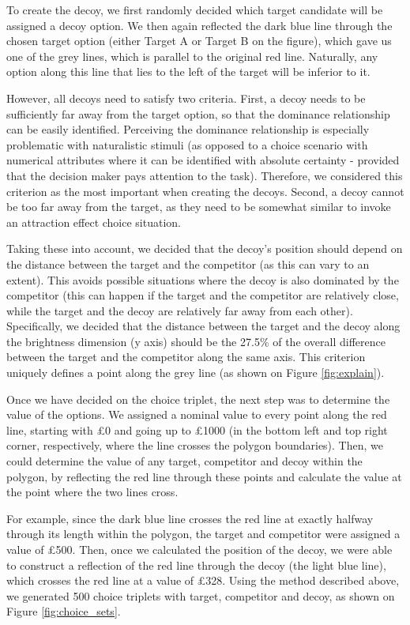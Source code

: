 \documentclass[11pt,a4paper]{article}
\begin{document}
To create the decoy, we first randomly decided which target candidate will be assigned a decoy option. We then again reflected the dark blue line through the chosen target option (either Target A or Target B on the figure), which gave us one of the grey lines, which is parallel to the original red line. Naturally, any option along this line that lies to the left of the target will be inferior to it. 

However, all decoys need to satisfy two criteria. First, a decoy needs to be sufficiently far away from the target option, so that the dominance relationship can be easily identified. Perceiving the dominance relationship is especially problematic with naturalistic stimuli (as opposed to a choice scenario with numerical attributes where it can be identified with absolute certainty - provided that the decision maker pays attention to the task). Therefore, we considered this criterion as the most important when creating the decoys. Second, a decoy cannot be too far away from the target, as they need to be somewhat similar to invoke an attraction effect choice situation.

Taking these into account, we decided that the decoy's position should depend on the distance between the target and the competitor (as this can vary to an extent). This avoids possible situations where the decoy is also dominated by the competitor (this can happen if the target and the competitor are relatively close, while the target and the decoy are relatively far away from each other). Specifically, we decided that the distance between the target and the decoy along the brightness dimension (y axis) should be the 27.5\% of the overall difference between the target and the competitor along the same axis. This criterion uniquely defines a point along the grey line (as shown on Figure \ref{fig:explain}).

Once we have decided on the choice triplet, the next step was to determine the value of the options. We assigned a nominal value to every point along the red line, starting with £0 and going up to £1000 (in the bottom left and top right corner, respectively, where the line crosses the polygon boundaries). Then, we could determine the value of any target, competitor and decoy within the polygon, by reflecting the red line through these points and calculate the value at the point where the two lines cross. 

For example, since the dark blue line crosses the red line at exactly halfway through its length within the polygon, the target and competitor were assigned a value of £500. Then, once we calculated the position of the decoy, we were able to construct a reflection of the red line through the decoy (the light blue line), which crosses the red line at a value of £328. Using the method described above, we generated 500 choice triplets with target, competitor and decoy, as shown on Figure \ref{fig:choice_sets}. 
\end{document}
